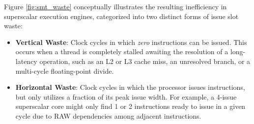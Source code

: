 Figure \ref{fig:smt_waste} conceptually illustrates the resulting inefficiency in superscalar execution engines, categorized into two distinct forms of issue slot waste:
\begin{itemize}
    \item \textbf{Vertical Waste}: Clock cycles in which \emph{zero} instructions can be issued. This occurs when a thread is completely stalled awaiting the resolution of a long-latency operation, such as an L2 or L3 cache miss, an unresolved branch, or a multi-cycle floating-point divide.
    \item \textbf{Horizontal Waste}: Clock cycles in which the processor issues instructions, but only utilizes a fraction of its peak issue width. For example, a 4-issue superscalar core might only find 1 or 2 instructions ready to issue in a given cycle due to RAW dependencies among adjacent instructions.
\end{itemize}

